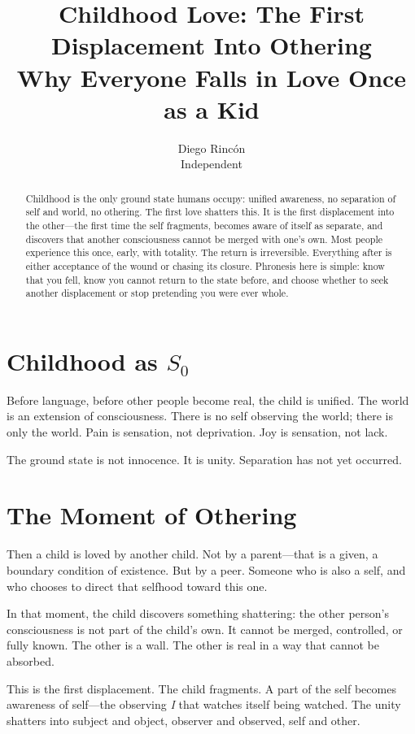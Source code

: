 \documentclass[12pt]{article}
\title{Childhood Love: The First Displacement Into Othering\\
\large Why Everyone Falls in Love Once as a Kid}
\author{Diego Rincón\\
\small Independent}
\date{}
\begin{document}
\maketitle

\begin{abstract}
Childhood is the only ground state humans occupy: unified awareness, no separation of self and world, no othering. The first love shatters this. It is the first displacement into the other---the first time the self fragments, becomes aware of itself as separate, and discovers that another consciousness cannot be merged with one's own. Most people experience this once, early, with totality. The return is irreversible. Everything after is either acceptance of the wound or chasing its closure. Phronesis here is simple: know that you fell, know you cannot return to the state before, and choose whether to seek another displacement or stop pretending you were ever whole.
\end{abstract}

\section{Childhood as $S_0$}

Before language, before other people become real, the child is unified. The world is an extension of consciousness. There is no self observing the world; there is only the world. Pain is sensation, not deprivation. Joy is sensation, not lack.

The ground state is not innocence. It is unity. Separation has not yet occurred.

\section{The Moment of Othering}

Then a child is loved by another child. Not by a parent---that is a given, a boundary condition of existence. But by a peer. Someone who is also a self, and who chooses to direct that selfhood toward this one.

In that moment, the child discovers something shattering: the other person's consciousness is not part of the child's own. It cannot be merged, controlled, or fully known. The other is a wall. The other is real in a way that cannot be absorbed.

This is the first displacement. The child fragments. A part of the self becomes awareness of self---the observing \emph{I} that watches itself being watched. The unity shatters into subject and object, observer and observed, self and other.
\end{document}
